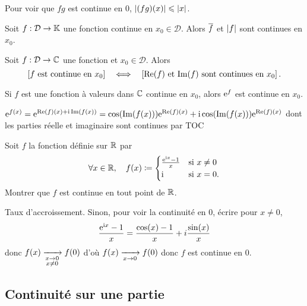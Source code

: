 \documentclass{magnolia}
\begin{document}
\begin{sol}
Pour voir que $fg$ est continue en $0$, $\left|(fg)(x)\right|\leqslant |x|$.
\end{sol}

\begin{proposition}[utile=-3]
Soit $f:\mathcal{D}\to\mathbb{K}$ une fonction continue en $x_0\in\mathcal{D}$. Alors $\overline{f}$ et $\left|f\right|$ sont
continues en $x_0$.  
\end{proposition}


\begin{proposition}[utile=-3]
Soit $f:\mathcal{D}\to\mathbb{C}$ une fonction et $x_0\in\mathcal{D}$. Alors
\[\left[\text{$f$ est continue en $x_0$}\right] \quad\Longleftrightarrow\quad
  \left[\text{$\mathop{\rm Re}(f)$ et $\mathop{\rm Im}(f)$ sont continues en $x_0$}\right].\]
\end{proposition}

\begin{remarqueUnique}
\remarque Si $f$ est une fonction à valeurs dans $\mathbb{C}$ continue en $x_0$, alors
  ${\rm e}^f$ est continue en $x_0$.
\end{remarqueUnique}
\begin{sol}
${\rm e}^{f(x)}={\rm e}^{\mathop{\rm Re}(f)(x)+{\rm i}\mathop{\rm Im}(f(x))}=\cos(\mathop{\rm Im}(f(x))){\rm e}^{\mathop{\rm Re}(f)(x)}+{\rm i}\cos(\mathop{\rm Im}(f(x))){\rm e}^{\mathop{\rm Re}(f)(x)}$ dont les parties réelle et imaginaire sont continues par TOC
\end{sol}

\begin{exos}
\exo Soit $f$ la fonction définie sur $\mathbb{R}$ par
  \[\forall x\in\mathbb{R} ,\quad f(x)\coloneqq
    \begin{cases}
    \frac{{\rm e}^{{\rm i} x}-1}{x} & \text{si $x\neq 0$}\\
    {\rm i} & \text{si $x=0$.}
    \end{cases}\]
  Montrer que $f$ est continue en tout point de $\mathbb{R}$.
\end{exos}

\begin{sol}
Taux d'accroissement.
Sinon, pour voir la continuité en $0$, écrire pour $x\neq 0$, $$\frac{{\rm e}^{{\rm i} x}-1}{x}=\frac{\cos(x)-1}{x}+i\frac{\sin(x)}{x}$$ donc $f(x)\xrightarrow[ \substack{x\rightarrow 0 \\ x\not=0}]{}f(0)$ d'où $f(x)\xrightarrow[x\rightarrow 0]{}f(0)$ donc $f$ est continue en $0$.
\end{sol}




\subsection{Continuité sur une partie}
\end{document}

